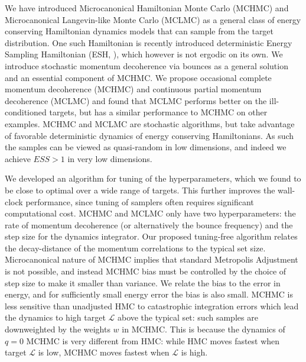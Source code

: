 \documentclass[twoside,11pt]{article}
\begin{document}
We have introduced Microcanonical Hamiltonian Monte Carlo (MCHMC) and 
Microcanonical Langevin-like Monte Carlo (MCLMC)
as a general class of energy conserving Hamiltonian dynamics models that can sample from the target 
distribution. One such Hamiltonian is recently introduced deterministic Energy Sampling Hamiltonian (ESH, \cite{ESH}), which 
however is not ergodic on its own. 
We introduce stochastic momentum decoherence via bounces as a general 
solution and an essential component 
of MCHMC. 
We propose occasional complete momentum decoherence (MCHMC) and 
continuous partial momentum decoherence (MCLMC) and found that MCLMC performs better on the ill-conditioned targets, but has a similar performance to MCHMC on other examples.
MCHMC and MCLMC  are stochastic algorithms, but 
take advantage of favorable 
deterministic dynamics of energy 
conserving Hamiltonians. As such 
the samples can be viewed as 
quasi-random in low dimensions, and indeed we 
achieve $ESS>1$ in very low 
dimensions. 

We developed an algorithm for tuning of 
the hyperparameters, which we found to be 
close to optimal over a wide range 
of targets. This further improves 
the wall-clock performance, since tuning of samplers often requires significant 
computational cost. MCHMC and MCLMC only have two 
 hyperparameters: the rate of momentum decoherence (or alternatively the bounce frequency) and the step size for the dynamics integrator. Our proposed tuning-free algorithm relates the decay-distance of the momentum correlations to the typical set size.  Microcanonical nature of MCHMC 
implies that standard Metropolis 
Adjustment is not possible, and 
instead MCHMC bias must be controlled 
by the choice of step size to make it
smaller than variance. We relate 
the bias to the error in 
 energy, and for sufficiently small
 energy error the bias
 is also small. MCHMC is less 
 sensitive than unadjusted HMC to catastrophic 
 integration errors which lead
 the dynamics to high target $\mathcal{L}$ above the typical set: such samples are 
 downweighted by the weights $w$ in MCHMC. 
 This is because the dynamics of $q=0$
 MCHMC is very different from HMC: while HMC moves fastest when 
 target $\mathcal{L}$ is low, MCHMC moves fastest when $\mathcal{L}$ is high. 

\end{document}
